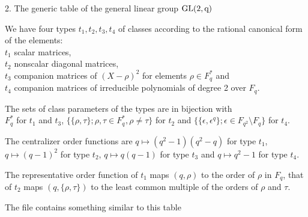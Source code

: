 2. The generic table of the general linear group $\rm{GL}(2,q)$\:

We have  four types  $t_1,  t_2, t_3, t_4$  of classes according  to  the
rational canonical form of the elements\::\\
$t_1$ scalar matrices,\\
$t_2$ nonscalar diagonal matrices,\\
$t_3$ companion matrices of $(X-\rho)^2$ for elements $\rho\in F_q^{\ast}$
      and\\
$t_4$ companion matrices of irreducible polynomials of degree 2 over $F_q$.

The sets of class parameters of the types are in bijection with\\
$F_q^{\ast}$ for $t_1$ and $t_3$,
$\{\{\rho,\tau\}; \rho, \tau\in F_q^{\ast}, \rho\not=\tau\}$ for $t_2$ and
$\{\{\epsilon,\epsilon^q\}; \epsilon\in F_{q^2}\setminus F_q\}$ for $t_4$.

The centralizer order functions are  $q  \mapsto (q^2-1)(q^2-q)$ for type
$t_1$,  $q \mapsto (q-1)^2$ for type $t_2$, $q  \mapsto q(q-1)$  for type
$t_3$ and $q \mapsto q^2-1$ for type $t_4$.

The representative  order function of $t_1$  maps $(q,\rho)$ to the order
of $\rho$ in  $F_q$, that  of $t_2$ maps $(q,\{\rho,\tau\})$ to the least
common multiple of the orders of $\rho$ and $\tau$.

The file contains something similar to this table\:

